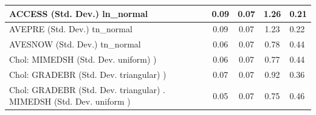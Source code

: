 \begin{table}
\begin{center}
\begin{tabular}{|l|l|c|c|c|l|}
			\hline
			ACCESS (Std. Dev.) ln_normal &  & 0.09 & 0.07 & 1.26 & 0.21 \\
			\hline
			AVEPRE (Std. Dev.) tn_normal &  & 0.09 & 0.07 & 1.23 & 0.22 \\
			\hline
			AVESNOW (Std. Dev.) tn_normal &  & 0.06 & 0.07 & 0.78 & 0.44 \\
			\hline
			 Chol: MIMEDSH (Std. Dev. uniform) ) &  & 0.06 & 0.07 & 0.77 & 0.44 \\
			\hline
			 Chol: GRADEBR (Std. Dev. triangular) ) &  & 0.07 & 0.07 & 0.92 & 0.36 \\
			\hline
			 Chol: GRADEBR (Std. Dev. triangular) . MIMEDSH (Std. Dev.   uniform ) &  & 0.05 & 0.07 & 0.75 & 0.46 \\
			\hline
		\end{tabular}
	\end{center}
\end{table}